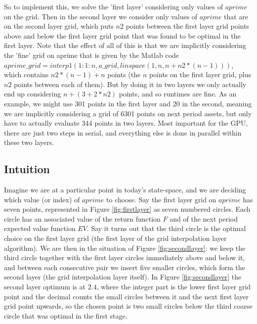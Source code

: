 \documentclass[11pt,fleqn]{article}
\begin{document}
So to implement this, we solve the 'first layer' considering only values of $aprime$ on the grid. Then in the second layer we consider only values of $aprime$ that are on the second layer grid, which puts $n2$ points between the first layer grid points above and below the first layer grid point that was found to be optimal in the first layer. Note that the effect of all of this is that we are implicitly considering the 'fine' grid on aprime that is given by the Matlab code $aprime\_{}grid=interp1(1:1:n,a\_{}grid,linspace(1,n,n+n2*(n-1)))$, which contains $n2*(n-1)+n$ points (the $n$ points on the first layer grid, plus $n2$ points between each of them). But by doing it in two layers we only actually end up considering $n+(3+2*n2)$ points, and so runtimes are fine. As an example, we might use 301 points in the first layer and 20 in the second, meaning we are implicitly considering a grid of 6301 points on next period assets, but only have to actually evaluate 344 points in two layers. Most important for the GPU, there are just two steps in serial, and everything else is done in parallel within these two layers.

\newpage

\subsection*{Intuition}
Imagine we are at a particular point in today's state-space, and we are deciding which value (or index) of $aprime$ to choose. Say the first layer grid on $aprime$ has seven points, represented in Figure \ref{fig:firstlayer} as seven numbered circles. Each circle has an associated value of the return function $F$ and of the next period expected value function $EV$. Say it turns out that the third circle is the optimal choice on the first layer grid (the first layer of the grid interpolation layer algorithm). We are then in the situation of Figure \ref{fig:secondlayer}: we keep the third circle together with the first layer circles immediately above and below it, and between each consecutive pair we insert five smaller circles, which form the second layer (the grid interpolation layer itself). In Figure \ref{fig:secondlayer} the second layer optimum is at $2.4$, where the integer part is the lower first layer grid point and the decimal counts the small circles between it and the next first layer grid point upwards, so the chosen point is two small circles below the third coarse circle that was optimal in the first stage.
\end{document}
